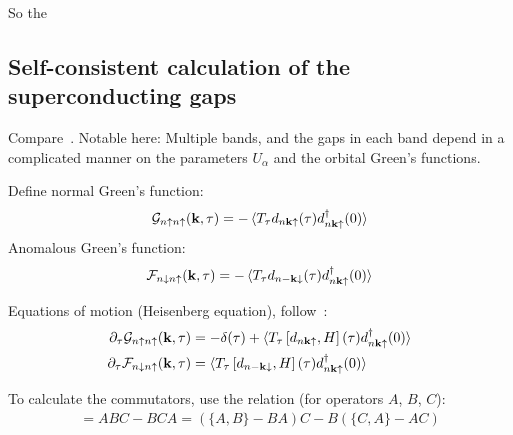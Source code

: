 So the 


\subsection{Self-consistent calculation of the superconducting gaps}

Compare~\cite[ch. 10]{Bruus_Flensberg_2004}.
Notable here: Multiple bands, and the gaps in each band depend in a complicated manner on the parameters \(U_{\alpha}\) and the orbital Green's functions.

Define normal Green's function:
\begin{equation}
    \mathcal{G}_{n\uparrow n\uparrow} (\bm{\mathrm{k}}, \tau) = -\braket{T_{\tau} d_{n \bm{\mathrm{k}} \uparrow} (\tau) d_{n \bm{\mathrm{k}} \uparrow}^{\dagger} (0)}
\end{equation}
Anomalous Green's function:
\begin{equation}
    \mathcal{F}_{n\downarrow n\uparrow} (\bm{\mathrm{k}}, \tau) = -\braket{T_{\tau} d_{n -\bm{\mathrm{k}} \downarrow} (\tau) d_{n \bm{\mathrm{k}} \uparrow}^{\dagger} (0)}
\end{equation}

Equations of motion (Heisenberg equation), follow~\cite[ch. 17]{Bruus_Flensberg_2004}:
\begin{align}
    \pdif{\tau} \mathcal{G}_{n\uparrow n\uparrow} (\vb{k}, \tau) &= -\delta (\tau) + \braket{T_{\tau} \left[d_{n \vb{k} \uparrow}, H\right] (\tau) d_{n \vb{k} \uparrow}^{\dagger} (0)} \\
    \pdif{\tau} \mathcal{F}_{n\downarrow n\uparrow} (\vb{k}, \tau) &= \braket{T_{\tau} \left[d_{n -\vb{k} \downarrow}, H\right] (\tau) d_{n \vb{k} \uparrow}^{\dagger} (0)}
\end{align}

To calculate the commutators, use the relation (for operators \(A\), \(B\), \(C\)):
\begin{align}
    [A, BC] = ABC - BCA = (\{A, B\} - BA) C - B(\{C, A\} - AC)
\end{align}

